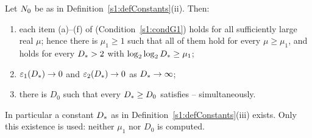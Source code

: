 \begin{lemma}\label{s7:lemGammaSat}
Let $N_{0}$ be as in Definition~\ref{s1:defConstants}(ii). Then:
\begin{enumerate}
\item[(i)] each item (a)--(f) of  (Condition~\ref{s1:condG1}) holds for
all sufficiently large real $\mu$; hence there is $\mu_1\ge1$ such that all of them
hold for every $\mu\ge\mu_1$, and  holds for every $D_{*}>2$ with
$\log_2\log_2D_{*}\ge\mu_1$;
\item[(ii)] $\varepsilon_{1}(D_{*})\to0$ and $\varepsilon_{2}(D_{*})\to0$ as $D_{*}\to\infty$;
\item[(iii)] there is $D_0$ such that every $D_{*}\ge D_0$ satisfies
-- simultaneously.
\end{enumerate}
In particular a constant $D_{*}$ as in Definition~\ref{s1:defConstants}(iii)
exists. Only this existence is used: neither $\mu_1$ nor $D_0$ is computed.
\deps{\ref{s1:condGamma}, \ref{s7:propCost}, \ref{s7:lemUHsplit}, \ref{s5:lemExpect}, \ref{s5:lemKRED}, \ref{s2:lemTower}, \ref{s7:lemEXprime}, \ref{s6:thmCONCL}, \ref{s1:defConstants}, \ref{s3:lemCOL}, \ref{s5:lemE1}, \ref{s3:lemCOLJVev}}
\end{lemma}

